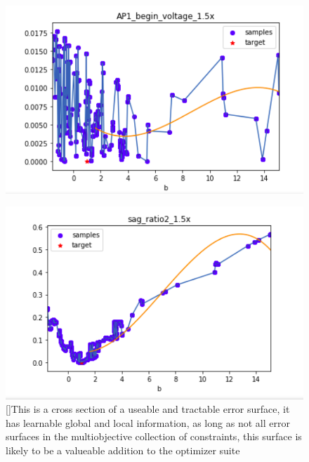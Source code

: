 \begin{figure}
\centering


    
    \begin{minipage}{.5\textwidth}
      \centering
      \includegraphics[scale=0.85]{figures/parameter_b_hopeless_surface.png}
      \label{fig:probably_smooth_constraint}
    \end{minipage}

    \begin{minipage}{.5\textwidth}
      \centering
      \includegraphics[scale=0.85]{figures/parameter_b_friendly_surface.png}
      []{This is a cross section of a useable and tractable error surface, it has learnable global and local information, as long as not all error surfaces in the multiobjective collection of constraints, this surface is likely to be a valueable addition to the optimizer suite}
      \label{fig:test2}
    \end{minipage}


\end{figure}



